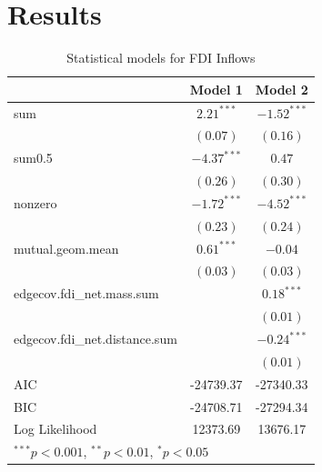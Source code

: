 \documentclass{article}
\begin{document}
\section{Results}
\begin{table}[!htbp] 
\begin{center}
\begin{tabular}{l c c }
\hline
 & Model 1 & Model 2 \\
\hline
sum                           & $2.21^{***}$  & $-1.52^{***}$ \\
                              & $(0.07)$      & $(0.16)$      \\
sum0.5                        & $-4.37^{***}$ & $0.47$        \\
                              & $(0.26)$      & $(0.30)$      \\
nonzero                       & $-1.72^{***}$ & $-4.52^{***}$ \\
                              & $(0.23)$      & $(0.24)$      \\
mutual.geom.mean              & $0.61^{***}$  & $-0.04$       \\
                              & $(0.03)$      & $(0.03)$      \\
edgecov.fdi\_net.mass.sum     &               & $0.18^{***}$  \\
                              &               & $(0.01)$      \\
edgecov.fdi\_net.distance.sum &               & $-0.24^{***}$ \\
                              &               & $(0.01)$      \\
\hline
AIC                           & -24739.37     & -27340.33     \\
BIC                           & -24708.71     & -27294.34     \\
Log Likelihood                & 12373.69      & 13676.17      \\
\hline
\multicolumn{3}{l}{\scriptsize{$^{***}p<0.001$, $^{**}p<0.01$, $^*p<0.05$}}
\end{tabular}
\caption{Statistical models for FDI Inflows}
\label{table:coefficients}
\end{center}
\end{table}
\end{document}

